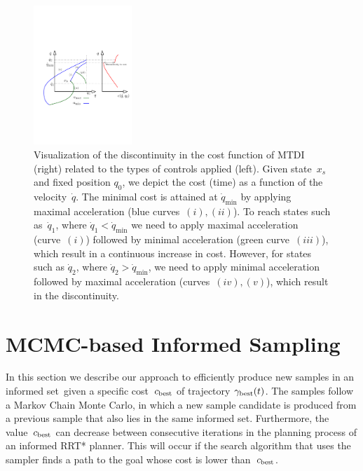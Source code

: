 \documentclass[letterpaper, 10 pt, conference]{ieeeconf}  %
\begin{document}
\begin{figure}[tb]
  \centering
  	\includegraphics[height = 5.25cm ]{fig/cost_discontinuity.pdf}
  \caption{
    \captionstyle
  	Visualization of the discontinuity in the cost function of MTDI (right) related to the types of controls applied (left). 
  	Given state~$x_s$ and fixed position $q_0$, we depict the cost (time) as a function of the velocity~$\dot{q}$. 
  	The minimal cost is attained at $\dot{q}_{\min}$ by applying maximal acceleration (blue curves~$(i), (ii)$). 
  	To reach states such as~$\dot{q}_1$, where $\dot{q}_1 < \dot{q}_{\min}$ we need to apply maximal acceleration (curve~$(i)$) followed by minimal acceleration (green curve~$(iii)$), which result in a continuous increase in cost.
  	However, for states such as $\dot{q}_2$, where $\dot{q}_2 > \dot{q}_{\min}$, we need to apply minimal acceleration  followed by maximal acceleration (curves~$(iv), (v)$), which result in the discontinuity.
  	}
   	\label{fig:discont}
\end{figure}


\section{MCMC-based Informed Sampling}
\label{sec:algorithm}

In this section we describe our approach to efficiently produce new samples in an informed set~\Cinf given a specific cost~$c_{\rm best}$ of trajectory $\gamma_{\rm best}(t)$.
The samples follow a Markov Chain Monte Carlo, in which a new sample candidate is produced from a previous sample that also lies in the same informed set.
Furthermore, the value~$c_{\rm best}$ can decrease between consecutive iterations in the planning process of an informed RRT* planner.
This will occur if the search algorithm that uses the sampler finds a path to the goal whose cost is lower than~$c_{\rm best}$.
\end{document}
